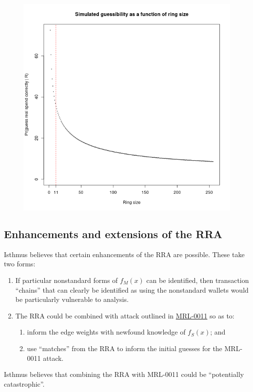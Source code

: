 \documentclass[english]{paper}
\begin{document}
\begin{figure}
\caption{}

\includegraphics[scale=0.75]{images/Guessibility-by-ring-size}
\end{figure}


\subsection{Enhancements and extensions of the RRA}

Isthmus believes that certain enhancements of the RRA are possible.
These take two forms:
\begin{enumerate}
\item If particular nonstandard forms of $f_{M}(x)$ can be identified,
then transaction ``chains'' that can clearly be identified as using
the nonstandard wallets would be particularly vulnerable to analysis.
\item The RRA could be combined with attack outlined in \href{https://www.overleaf.com/read/ccbmjkrhmrxk}{MRL-0011}
so as to:
\begin{enumerate}
\item inform the edge weights with newfound knowledge of $f_{S}(x)$; and
\item use ``matches'' from the RRA to inform the initial guesses for the
MRL-0011 attack.
\end{enumerate}
\end{enumerate}
Isthmus believes that combining the RRA with MRL-0011 could be ``potentially
catastrophic''.\\
\end{document}
